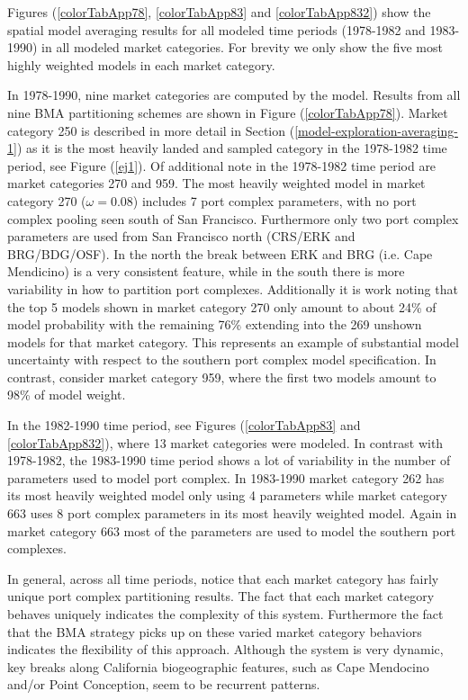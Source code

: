 \documentclass[12pt]{article}
\begin{document}
Figures (\ref{colorTabApp78}, \ref{colorTabApp83} and \ref{colorTabApp832}) show the spatial model 
averaging results for all modeled time periods (1978-1982 and 1983-1990) in 
all modeled market categories. For brevity we only show the five most highly 
weighted models in each market category.

In 1978-1990, nine market categories are computed by the model. Results from all 
nine BMA partitioning schemes are shown in Figure (\ref{colorTabApp78}). Market 
category 250 is described in more detail in Section (\ref{model-exploration-averaging-1}) 
as it is the most heavily landed and sampled category in the 1978-1982 time 
period, see Figure (\ref{ej1}). Of additional note in the 1978-1982 time period 
are market categories 270 and 959. The most heavily weighted model in market 
category 270 ($\omega=0.08$) includes 7 port complex parameters, with no port 
complex pooling seen south of San Francisco. Furthermore only two port complex 
parameters are used from San Francisco north (CRS/ERK and BRG/BDG/OSF). In the 
north the break between ERK and BRG (i.e. Cape Mendicino) is a very consistent 
feature, while in the south there is more variability in how to partition port 
complexes. Additionally it is work noting that the top 5 models shown in market 
category 270 only amount to about 24\% of model probability with the remaining 
76\% extending into the 269 unshown models for that market category. This 
represents an example of substantial model uncertainty with respect to the 
southern port complex model specification. In contrast, consider market category 
959, where the first two models amount to 98\% of model weight.

In the 1982-1990 time period, see 
Figures (\ref{colorTabApp83} and \ref{colorTabApp832}), where 13 market 
categories were modeled. In contrast with 1978-1982, the 1983-1990 time period 
shows a lot of variability in the number of parameters used to model port 
complex. In 1983-1990 market category 262 has its most heavily weighted model 
only using 4 parameters while market category 663 uses 8 port complex 
parameters in its most heavily weighted model. Again in market category 663 
most of the parameters are used to model the southern port complexes. 
  
In general, across all time periods, notice that each market category has 
fairly unique port complex partitioning results. The fact that each market 
category behaves uniquely indicates the complexity of this system. Furthermore 
the fact that the BMA strategy picks up on these varied market category 
behaviors indicates the flexibility of this approach. Although the system is 
very dynamic, key breaks along California biogeographic features, such as Cape 
Mendocino and/or Point Conception, seem to be recurrent patterns. 
\end{document}
